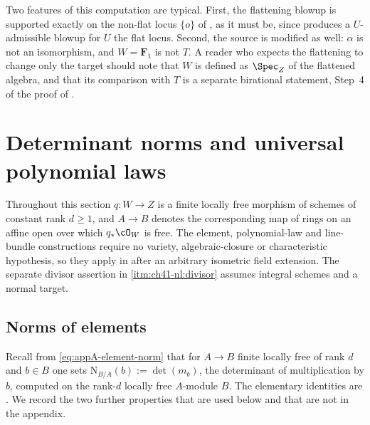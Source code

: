 \begin{example}
Two features of this computation are typical.  First, the flattening blowup
is supported exactly on the non-flat locus $\{o\}$ of
, as it must be, since
 produces a $U$-admissible blowup for $U$ the
flat locus.  Second, the source is modified as well:
$\alpha$ is not an isomorphism, and $W=\mathbf F_1$ is not $T$.  A
reader who expects the flattening to change only the target should note that
$W$ is defined as $\Spec_Z$ of the flattened algebra, and that its
comparison with $T$ is a separate birational statement, Step~4 of the
proof of .
\end{example}

\section{Determinant norms and universal polynomial laws}
\label{sec:ch41-determinant}

Throughout this section $q:W\to Z$ is a finite locally free morphism of
schemes of constant rank $d\ge1$, and $A\to B$ denotes the corresponding
map of rings on an affine open over which $q_*\cO_W$ is free.
The element, polynomial-law and line-bundle constructions require no
variety, algebraic-closure or characteristic hypothesis, so they apply in
 after an arbitrary isometric field extension.
The separate divisor assertion in
\cref{itm:ch41-nl:divisor} assumes integral schemes and a normal target.

\subsection{Norms of elements}
\label{sec:ch41-element-norm}

Recall from \eqref{eq:appA-element-norm} that for $A\to B$ finite locally
free of rank $d$ and $b\in B$ one sets
$\mathrm N_{B/A}(b):=\det(m_b)$, the determinant of multiplication by
$b$, computed on the rank-$d$ locally free $A$-module $B$.  The
elementary identities are .  We record the
two further properties that are used below and that are not in the
appendix.

